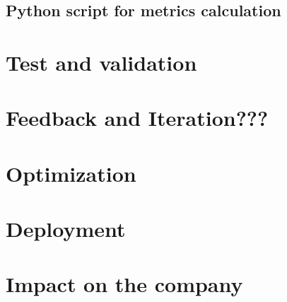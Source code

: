 \subsection{Python script for metrics calculation}

\section{Test and validation}

\section{Feedback and Iteration???}

\section{Optimization}

\section{Deployment}


\section{Impact on the company}